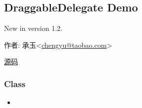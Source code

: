 \documentclass[letterpaper,10pt,english]{sphinxmanual}
\begin{document}
\subsection{DraggableDelegate Demo}
\label{demo/component/dd/draggable-delegate::doc}\label{demo/component/dd/draggable-delegate:draggabledelegate-demo}New in version 1.2.
\begin{DUlineblock}{0em}
\item[] 作者: 承玉\textless{}\href{mailto:chengyu@taobao.com}{chengyu@taobao.com}\textgreater{}
\item[] \href{https://github.com/kissyteam/kissy/tree/master/src/dd/draggable-delegate.js}{源码}
\end{DUlineblock}


\subsubsection{Class}
\label{demo/component/dd/draggable-delegate:class}\begin{itemize}
\item {}
{\hyperref[api/component/dd/draggable-delegate:DraggableDelegate.DraggableDelegate]{}}

\end{itemize}
\end{document}
